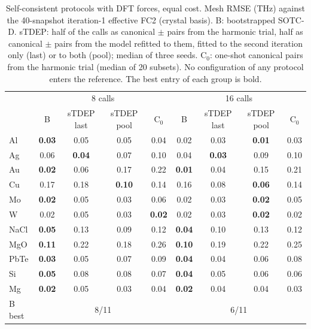 \begin{table}[t]
\caption{Self-consistent protocols with DFT forces, equal cost. Mesh RMSE (THz) against the 40-snapshot iteration-1 effective FC2 (crystal basis). B: bootstrapped SOTC-D. sTDEP: half of the calls as canonical $\pm$ pairs from the harmonic trial, half as canonical $\pm$ pairs from the model refitted to them, fitted to the second iteration only (last) or to both (pool); median of three seeds. C$_0$: one-shot canonical pairs from the harmonic trial (median of 20 subsets). No configuration of any protocol enters the reference. The best entry of each group is bold.}
\label{tab:stdep_crystal}
\begin{ruledtabular}
\begin{tabular}{lcccccccc}
 & \multicolumn{4}{c}{8 calls} & \multicolumn{4}{c}{16 calls}\\
 & B & sTDEP last & sTDEP pool & C$_0$ & B & sTDEP last & sTDEP pool & C$_0$\\
\hline
Al & \textbf{0.03} & 0.05 & 0.05 & 0.04 & 0.02 & 0.03 & \textbf{0.01} & 0.03\\
Ag & 0.06 & \textbf{0.04} & 0.07 & 0.10 & 0.04 & \textbf{0.03} & 0.09 & 0.10\\
Au & \textbf{0.02} & 0.06 & 0.17 & 0.22 & \textbf{0.01} & 0.04 & 0.15 & 0.21\\
Cu & 0.17 & 0.18 & \textbf{0.10} & 0.14 & 0.16 & 0.08 & \textbf{0.06} & 0.14\\
Mo & \textbf{0.02} & 0.05 & 0.03 & 0.06 & 0.02 & 0.03 & \textbf{0.02} & 0.05\\
W & 0.02 & 0.05 & 0.03 & \textbf{0.02} & 0.02 & 0.03 & \textbf{0.02} & 0.02\\
NaCl & \textbf{0.05} & 0.13 & 0.09 & 0.12 & \textbf{0.04} & 0.10 & 0.13 & 0.12\\
MgO & \textbf{0.11} & 0.22 & 0.18 & 0.26 & \textbf{0.10} & 0.19 & 0.22 & 0.25\\
PbTe & \textbf{0.03} & 0.05 & 0.07 & 0.09 & \textbf{0.04} & 0.04 & 0.06 & 0.08\\
Si & \textbf{0.05} & 0.08 & 0.08 & 0.07 & \textbf{0.04} & 0.05 & 0.06 & 0.06\\
Mg & \textbf{0.02} & 0.05 & 0.03 & 0.04 & \textbf{0.02} & 0.04 & 0.04 & 0.03\\
\hline
B best & \multicolumn{4}{c}{8/11} & \multicolumn{4}{c}{6/11}\\
\end{tabular}
\end{ruledtabular}
\end{table}
